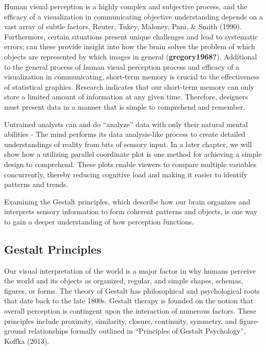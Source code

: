 \documentclass[print]{nuthesis}
\begin{document}
Human visual perception is a highly complex and subjective process, and the efficacy of a visualization in communicating objective understanding depends on a vast array of subtle factors, Reuter, Tukey, Maloney, Pani, \& Smith (1990).
Furthermore, certain situations present unique challenges and lead to systematic errors; can these provide insight into how the brain solves the problem of which objects are represented by which images in general (\textbf{gregory1968?}).
Additional to the general process of human visual perception process and efficacy of a visualization in communicating, short-term memory is crucial to the effectiveness of statistical graphics.
Research indicates that our short-term memory can only store a limited amount of information at any given time.
Therefore, designers must present data in a manner that is simple to comprehend and remember.

Untrained analysts can and do ``analyze'' data with only their natural mental abilities - The mind performs its data analysis-like process to create detailed understandings of reality from bits of sensory input.
In a later chapter, we will show how a utilizing parallel coordinate plot is one method for achieving a simple design to comprehend.
These plots enable viewers to compare multiple variables concurrently, thereby reducing cognitive load and making it easier to identify patterns and trends.

Examining the Gestalt principles, which describe how our brain organizes and interprets sensory information to form coherent patterns and objects, is one way to gain a deeper understanding of how perception functions.

\hypertarget{gestalt-principles}{%
\subsection{Gestalt Principles}\label{gestalt-principles}}

Our visual interpretation of the world is a major factor in why humans perceive the world and its objects as organized, regular, and simple shapes, schemas, figures, or forms.
The theory of Gestalt has philosophical and psychological roots that date back to the late 1800s.
Gestalt therapy is founded on the notion that overall perception is contingent upon the interaction of numerous factors.
These principles include proximity, similarity, closure, continuity, symmetry, and figure-ground relationships formally outlined in ``Principles of Gestalt Psychology'', Koffka (2013).
\end{document}
